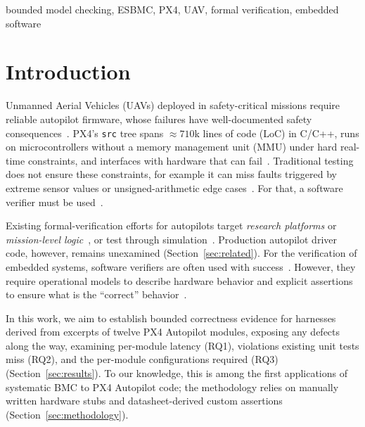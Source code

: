 \documentclass[conference]{IEEEtran}
\newcommand{\entra}[1]{#1}
\begin{document}
\begin{IEEEkeywords}
bounded model checking, ESBMC, PX4, UAV, formal verification, embedded software
\end{IEEEkeywords}


\section{Introduction}
\label{sec:introduction}

\entra{Unmanned Aerial Vehicles (UAVs)} deployed in safety-critical missions
require reliable autopilot
firmware, whose failures have well-documented safety
consequences~\cite{Wanner2024}.
PX4's \texttt{src} tree spans ${\approx}710$k \entra{lines of code (LoC)} in
C/C++, runs on microcontrollers \entra{without a memory management unit
(MMU)} under hard real-time constraints, and interfaces
with hardware that can fail~\cite{PX4_GitHub,Wanner2024}.
Traditional testing does not ensure these constraints, for example it can miss faults triggered by extreme sensor values
or unsigned-arithmetic edge cases~\cite{Khatiri2024}. For that, a software verifier must be used~\cite{Dijkstra1972}.

Existing formal-verification efforts for autopilots target \textit{research
platforms} or \textit{mission-level logic}~\cite{Pollien2023,Bernardeschi2023},
or test through simulation~\cite{Khatiri2024}.
Production autopilot driver code, however, remains unexamined (Section~\ref{sec:related}). For the verification of embedded systems, software verifiers are often used with success~\cite{Sousa2026}. However, they require operational models to
describe hardware behavior and explicit assertions to ensure
what is the ``correct'' behavior~\cite{Post2007}.


In this work, we aim to establish bounded correctness evidence for harnesses derived from excerpts of twelve PX4 Autopilot modules, exposing any defects along the way, examining per-module latency (RQ1), violations existing unit tests miss (RQ2), and the per-module configurations required (RQ3)
(Section~\ref{sec:results}). To our knowledge, this is among the first applications of systematic BMC to PX4 Autopilot code; the methodology relies on manually written hardware stubs and datasheet-derived custom assertions (Section~\ref{sec:methodology}).

\end{document}
